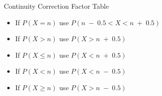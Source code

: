 




\begin{framed}
\large
\noindent Continuity Correction Factor Table

\begin{itemize}
\item If   $P(X=n)$ use   $P(n \;-\; 0.5 < X < n \;+\; 0.5)$
\item If   $P(X > n)$ use   $P(X > n \;+\; 0.5)$
\item If   $P(X \leq n)$ use    $P(X < n \;+\; 0.5)$
\item If    $P(X < n)$ use   $P(X < n \;-\; 0.5)$
\item If    $P(X \geq n)$ use   $P(X > n \;-\; 0.5)$
\end{itemize}
\end{framed}
